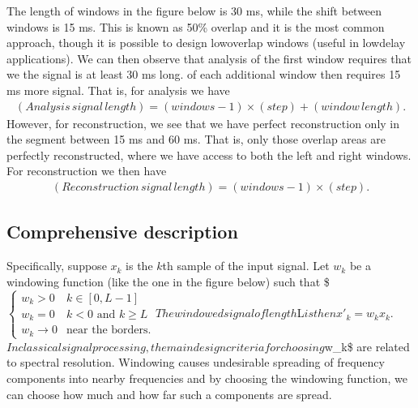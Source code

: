 \documentclass[letterpaper,10pt,english]{jupyterBook}
\begin{document}
\sphinxAtStartPar
The length of windows in the figure below is 30 ms, while the
shift between windows is 15 ms. This is known as 50\% overlap and it is
the most common approach, though it is possible to design low\sphinxhyphen{}overlap
windows (useful in low\sphinxhyphen{}delay applications). We can then observe that
analysis of the first window requires that we the signal is at least 30
ms long.  of each additional window then requires 15 ms more
signal. That is, for analysis we have
\begin{equation*}
\begin{split} (Analysis\,signal\,length) = (windows-1)\times(step) +
(window\,length). \end{split}
\end{equation*}
\sphinxAtStartPar
However, for reconstruction, we see that we have perfect reconstruction
only in the segment between 15 ms and 60 ms. That is, only those overlap
areas are perfectly reconstructed, where we have access to both the left
and right windows. For reconstruction we then have
\begin{equation*}
\begin{split} (Reconstruction\,signal\,length) = (windows-1)\times(step). \end{split}
\end{equation*}


\sphinxAtStartPar
{}


\subsection{Comprehensive description}
\label{\detokenize{Representations/Windowing:comprehensive-description}}
\sphinxAtStartPar
Specifically, suppose \(x_k\) is the \(k\)th sample of the input
signal. Let \(w_k\) be a windowing function (like the one in the
figure below) such that
\$\( \begin{cases} w_k > 0 & k\in[0,L-1] \\ w_k = 0 & k < 0
\text{ and } k \geq L\\ w_k \rightarrow 0 & \text{near the
borders}. \end{cases} \)\(
The windowed signal of length \)L\( is then
\)\( x'_k = w_k x_k. \)\(
In classical signal processing, the main design criteria for
choosing \)w\_k\$ are related to spectral resolution. Windowing
causes undesirable spreading of frequency components into nearby
frequencies and by choosing the windowing function, we can choose how
much and how far such a components are spread.
\end{document}
